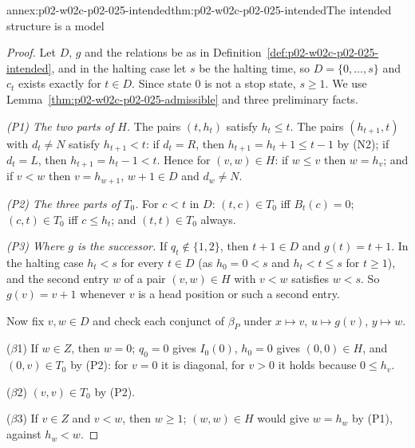 \begin{annexitem}{annex:p02-w02c-p02-025-intended}{thm:p02-w02c-p02-025-intended}{The intended structure is a model}
\begin{proof}
Let \(D\), \(g\) and the relations be as in
Definition~\ref{def:p02-w02c-p02-025-intended}, and in the halting case let \(s\)
be the halting time, so \(D=\{0,\ldots,s\}\) and \(c_t\) exists exactly for
\(t\in D\).  Since state \(0\) is not a stop state, \(s\geq1\).  We use
Lemma~\ref{thm:p02-w02c-p02-025-admissible} and three preliminary facts.

\emph{(P1) The two parts of \(H\).}  The pairs \((t,h_t)\) satisfy
\(h_t\leq t\).  The pairs \((h_{t+1},t)\) with \(d_t\neq N\) satisfy
\(h_{t+1}<t\): if \(d_t=R\), then \(h_{t+1}=h_t+1\leq t-1\) by (N2); if \(d_t=L\),
then \(h_{t+1}=h_t-1<t\).  Hence for \((v,w)\in H\): if \(w\leq v\) then
\(w=h_v\); and if \(v<w\) then \(v=h_{w+1}\), \(w+1\in D\) and \(d_w\neq N\).

\emph{(P2) The three parts of \(T_0\).}  For \(c<t\) in \(D\):
\((t,c)\in T_0\) iff \(B_t(c)=0\); \((c,t)\in T_0\) iff \(c\leq h_t\); and
\((t,t)\in T_0\) always.

\emph{(P3) Where \(g\) is the successor.}  If \(q_t\notin\{1,2\}\), then
\(t+1\in D\) and \(g(t)=t+1\).  In the halting case \(h_t<s\) for every
\(t\in D\) (as \(h_0=0<s\) and \(h_t<t\leq s\) for \(t\geq1\)), and the
second entry \(w\) of a pair \((v,w)\in H\) with \(v<w\) satisfies \(w<s\).  So
\(g(v)=v+1\) whenever \(v\) is a head position or such a second entry.

Now fix \(v,w\in D\) and check each conjunct of \(\beta_P\) under
\(x\mapsto v\), \(u\mapsto g(v)\), \(y\mapsto w\).

(\(\beta\)1) If \(w\in Z\), then \(w=0\); \(q_0=0\) gives \(I_0(0)\), \(h_0=0\)
gives \((0,0)\in H\), and \((0,v)\in T_0\) by (P2): for \(v=0\) it is diagonal,
for \(v>0\) it holds because \(0\leq h_v\).

(\(\beta\)2) \((v,v)\in T_0\) by (P2).

(\(\beta\)3) If \(v\in Z\) and \(v<w\), then \(w\geq1\); \((w,w)\in H\) would
give \(w=h_w\) by (P1), against \(h_w<w\).


\end{proof}
\end{annexitem}
